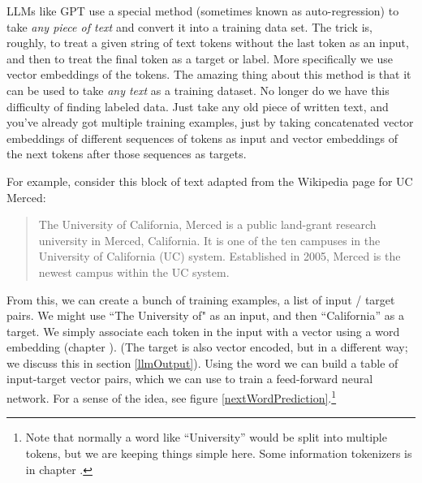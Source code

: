 LLMs like GPT use a special method (sometimes known as auto-regression) to take \emph{any piece of text} and convert it into a training data set. The trick is, roughly, to treat a given string of text tokens without the last token as an input, and then to treat the final token as a target or label. More specifically we use vector embeddings of the tokens. The amazing thing about this method is that it can be used to take \emph{any text} as a training dataset. No longer do we have this difficulty of finding labeled data. Just take any old piece of written text, and you've already got multiple training examples, just by taking concatenated vector embeddings of different sequences of tokens as input and vector embeddings of the next tokens after those sequences as targets.

For example, consider this block of text adapted from the Wikipedia page for UC Merced:

\begin{quote}
The University of California, Merced is a public land-grant research university in Merced, California. It is one of the ten campuses in the University of California (UC) system. Established in 2005, Merced is the newest campus within the UC system.
\end{quote}

From this, we can create a bunch of training examples, a list of input / target pairs. We might use ``The University of" as an input, and then ``California'' as a target. We simply associate each token in the input with a vector using a word embedding (chapter ). (The target is also vector encoded, but in a different way; we discuss this in section \ref{llmOutput}). Using the word we can build a table of input-target vector pairs, which we can use to train a feed-forward neural network. For a sense of the idea, see figure \ref{nextWordPrediction}.\footnote{Note that normally a word like ``University'' would be split into multiple tokens, but we are keeping things simple here. Some information tokenizers is in chapter .} 

